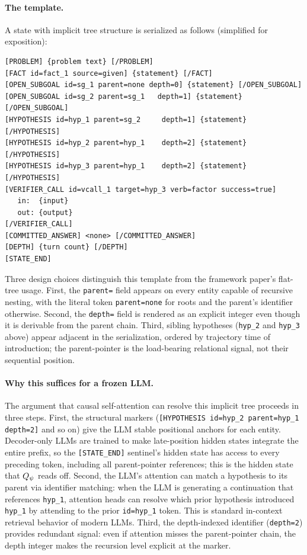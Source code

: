 \paragraph{The template.}
A state with implicit tree structure is serialized as follows
(simplified for exposition):

\begin{lstlisting}[basicstyle=\ttfamily\footnotesize]
[PROBLEM] {problem text} [/PROBLEM]
[FACT id=fact_1 source=given] {statement} [/FACT]
[OPEN_SUBGOAL id=sg_1 parent=none depth=0] {statement} [/OPEN_SUBGOAL]
[OPEN_SUBGOAL id=sg_2 parent=sg_1   depth=1] {statement} [/OPEN_SUBGOAL]
[HYPOTHESIS id=hyp_1 parent=sg_2     depth=1] {statement} [/HYPOTHESIS]
[HYPOTHESIS id=hyp_2 parent=hyp_1    depth=2] {statement} [/HYPOTHESIS]
[HYPOTHESIS id=hyp_3 parent=hyp_1    depth=2] {statement} [/HYPOTHESIS]
[VERIFIER_CALL id=vcall_1 target=hyp_3 verb=factor success=true]
   in:  {input}
   out: {output}
[/VERIFIER_CALL]
[COMMITTED_ANSWER] <none> [/COMMITTED_ANSWER]
[DEPTH] {turn count} [/DEPTH]
[STATE_END]
\end{lstlisting}

Three design choices distinguish this template from the framework
paper's flat-tree usage. First, the \texttt{parent=} field appears on
every entity capable of recursive nesting, with the literal token
\texttt{parent=none} for roots and the parent's identifier otherwise.
Second, the \texttt{depth=} field is rendered as an explicit integer
even though it is derivable from the parent chain. Third, sibling
hypotheses (\texttt{hyp\_2} and \texttt{hyp\_3} above) appear adjacent
in the serialization, ordered by trajectory time of introduction; the
parent-pointer is the load-bearing relational signal, not their
sequential position.

\paragraph{Why this suffices for a frozen LLM.}
The argument that causal self-attention can resolve this implicit tree
proceeds in three steps. First, the structural markers
(\texttt{[HYPOTHESIS id=hyp\_2 parent=hyp\_1 depth=2]} and so on) give
the LLM stable positional anchors for each entity. Decoder-only LLMs are
trained to make late-position hidden states integrate the entire
prefix, so the \texttt{[STATE\_END]} sentinel's hidden state has access
to every preceding token, including all parent-pointer references; this
is the hidden state that $Q_{\psi}$ reads off. Second, the LLM's attention
can match a hypothesis to its parent via identifier matching: when the
LLM is generating a continuation that references \texttt{hyp\_1},
attention heads can resolve which prior hypothesis introduced
\texttt{hyp\_1} by attending to the prior \texttt{id=hyp\_1} token. This
is standard in-context retrieval behavior of modern LLMs. Third, the
depth-indexed identifier (\texttt{depth=2}) provides redundant signal:
even if attention misses the parent-pointer chain, the depth integer
makes the recursion level explicit at the marker.

